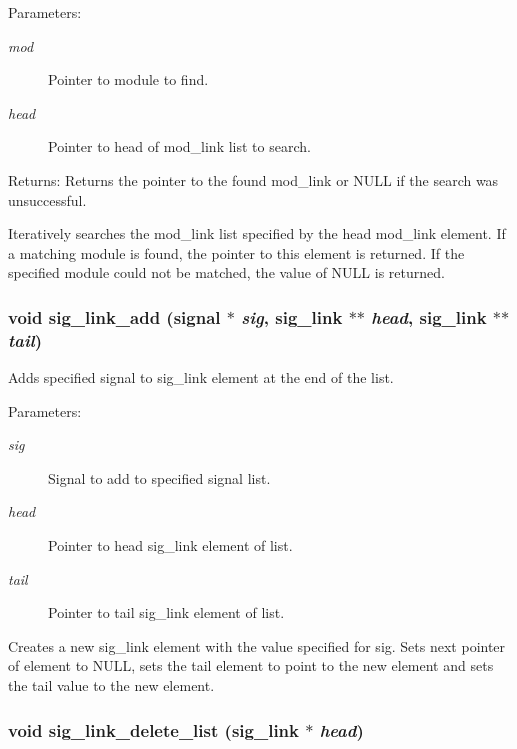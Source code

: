 \begin{Desc}
\item[Parameters:]
\begin{description}
\item[{\em mod}]Pointer to module to find. \item[{\em head}]Pointer to head of mod\_\-link list to search.\end{description}
\end{Desc}
\begin{Desc}
\item[Returns:]Returns the pointer to the found mod\_\-link or NULL if the search was unsuccessful.\end{Desc}
Iteratively searches the mod\_\-link list specified by the head mod\_\-link element. If a matching module is found, the pointer to this element is returned. If the specified module could not be matched, the value of NULL is returned. 
\subsubsection{\setlength{\rightskip}{0pt plus 5cm}void sig\_\-link\_\-add ({\bf signal} $\ast$ {\em sig}, {\bf sig\_\-link} $\ast$$\ast$ {\em head}, {\bf sig\_\-link} $\ast$$\ast$ {\em tail})}\label{link_8c_a4}


Adds specified signal to sig\_\-link element at the end of the list.

\begin{Desc}
\item[Parameters:]
\begin{description}
\item[{\em sig}]Signal to add to specified signal list. \item[{\em head}]Pointer to head sig\_\-link element of list. \item[{\em tail}]Pointer to tail sig\_\-link element of list.\end{description}
\end{Desc}
Creates a new sig\_\-link element with the value specified for sig. Sets next pointer of element to NULL, sets the tail element to point to the new element and sets the tail value to the new element. 
\subsubsection{\setlength{\rightskip}{0pt plus 5cm}void sig\_\-link\_\-delete\_\-list ({\bf sig\_\-link} $\ast$ {\em head})}\label{link_8c_a21}



